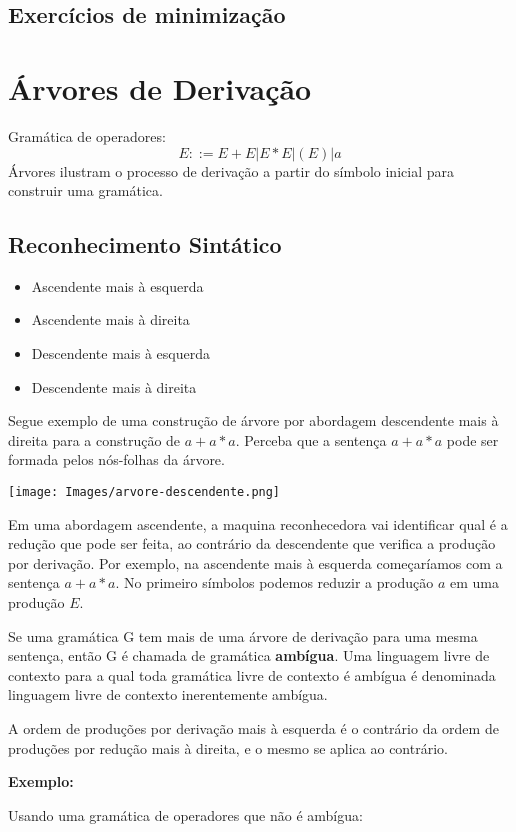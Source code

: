 \documentclass[]{article}
\begin{document}
	\subsection{Exercícios de minimização}
\section{Árvores de Derivação}
	Gramática de operadores:
	$$E::= E+E | E*E | (E)| a$$
	Árvores ilustram o processo de derivação a partir do símbolo inicial para construir uma gramática.
	
	\subsection{Reconhecimento Sintático}
		\begin{itemize}
			\item Ascendente mais à esquerda
			\item Ascendente mais à direita
			\item Descendente mais à esquerda
			\item Descendente mais à direita
		\end{itemize}
		Segue exemplo de uma construção de árvore por abordagem descendente mais à direita para a construção de $a+a*a$. Perceba que a sentença $a+a*a$ pode ser formada pelos nós-folhas da árvore.
		\begin{center}
		\texttt{[image: Images/arvore-descendente.png]}		
		\end{center}
		
		Em uma abordagem ascendente, a maquina reconhecedora vai identificar qual é a redução que pode ser feita, ao contrário da descendente que verifica a produção por derivação. Por exemplo, na ascendente mais à esquerda começaríamos com a sentença $a+a*a$.  No primeiro símbolos podemos reduzir a produção $a$ em uma produção $E$.
		
		Se uma gramática G tem mais de uma árvore de derivação para uma mesma sentença, então  G é chamada de gramática \textbf{ambígua}. Uma linguagem livre de contexto para a qual toda gramática  livre de contexto é ambígua é denominada linguagem livre de contexto inerentemente ambígua.
		
		A ordem de produções por derivação mais à esquerda é o contrário da ordem de produções por redução mais à direita, e o mesmo se aplica ao contrário.
		
		\newpage		
		\textbf{Exemplo:}
		
		Usando uma gramática de operadores que não é ambígua:
		
\end{document}
